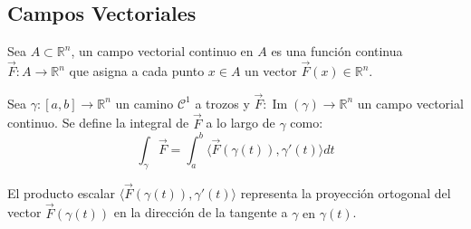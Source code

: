 
\subsection{Campos Vectoriales}

\begin{definición} 
Sea $A \subset \mathbb{R}^n$, un campo vectorial continuo en $A$ es una función continua $\vec{F} : A \to \mathbb{R}^n$ que asigna a cada punto $x \in A$ un vector $\vec{F}(x) \in \mathbb{R}^n$.
\end{definición}
\begin{definición} 
Sea $\gamma : [a, b] \to \mathbb{R}^n$ un camino $\mathcal{C}^1$ a trozos y $\vec{F} : \operatorname{Im}(\gamma) \to \mathbb{R}^n$ un campo vectorial continuo. Se define la integral de $\vec{F}$ a lo largo de $\gamma$ como:
\[
    \int_\gamma \vec{F} = \int_a^b \langle \vec{F}(\gamma(t)), \gamma'(t) \rangle dt
\]
\end{definición}

\begin{observación}
El producto escalar $\langle \vec{F}(\gamma(t)), \gamma'(t) \rangle$ representa la proyección ortogonal del vector $\vec{F}(\gamma(t))$ en la dirección de la tangente a $\gamma \text{ en } \gamma(t)$.

\end{observación}

